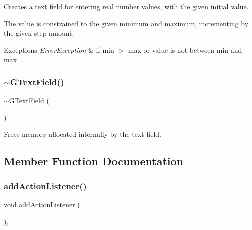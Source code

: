 Creates a text field for entering real number values, with the given initial value. 

The value is constrained to the given minimum and maximum, incrementing by the given step amount. 
\begin{DoxyExceptions}{Exceptions}
{\em Error\+Exception} & if min $>$ max or value is not between min and max \\
\hline
\end{DoxyExceptions}
\mbox{\label{classsgl_1_1GTextField_a3361f8538c9bd9337a7ccc533d3534c0}} 
\subsubsection{\texorpdfstring{$\sim$\+G\+Text\+Field()}{~GTextField()}}
{\footnotesize\ttfamily $\sim$\mbox{\hyperlink{classsgl_1_1GTextField}{G\+Text\+Field}} (\begin{DoxyParamCaption}{ }\end{DoxyParamCaption})\hspace{0.3cm}{\ttfamily [override]}}



Frees memory allocated internally by the text field. 



\subsection{Member Function Documentation}
\mbox{\label{classsgl_1_1GInteractor_a02f20ea6edfa0671f31c4c648a253833}} 
\subsubsection{\texorpdfstring{add\+Action\+Listener()}{addActionListener()}}
{\footnotesize\ttfamily void add\+Action\+Listener (\begin{DoxyParamCaption}{ }\end{DoxyParamCaption})\hspace{0.3cm}{\ttfamily [virtual]}, {\ttfamily [inherited]}}



